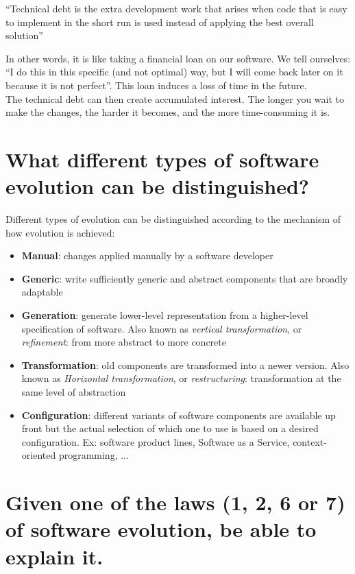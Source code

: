 \begin{mydef}
\enquote{Technical debt is the extra development work that arises when code that is easy to implement in the short run is used instead of applying the best overall solution}
\end{mydef}

In other words, it is like taking a financial loan on our software. We tell ourselves: \enquote{I do this in this specific (and not optimal) way, but I will come back later on it because it is not perfect}. This loan induces a loss of time in the future. \\

The technical debt can then create accumulated interest. The longer you wait to make the changes, the harder it becomes, and the more time-consuming it is.

\section{What different types of software evolution can be distinguished?}

Different types of evolution can be distinguished according to the mechanism of how evolution is achieved:
\begin{itemize}
\item \textbf{Manual}: changes applied manually by a software developer
\item \textbf{Generic}: write sufficiently generic and abstract components that are broadly adaptable
\item \textbf{Generation}: generate lower-level representation from a higher-level specification of software. Also known as \textit{vertical transformation}, or \textit{refinement}: from more abstract to more concrete
\item \textbf{Transformation}: old components are transformed into a newer version. Also known as \textit{Horizontal transformation}, or \textit{restructuring}: transformation at the same level of abstraction
\item \textbf{Configuration}: different variants of software components are available  up front but the actual selection of which one to use is based on a desired configuration. Ex: software product lines, Software as a Service, context-oriented programming, ...
\end{itemize}

\section{Given one of the laws (1, 2, 6 or 7) of software evolution, be able to explain it.}

